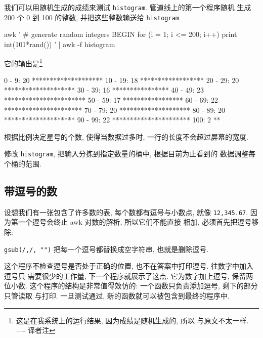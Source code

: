 我们可以用随机生成的成绩来测试 \verb'histogram'. 管道线上的第一个程序随机
生成 200 个 0 到 100 的整数, 并把这些整数输送给 \verb'histogram'
\begin{awkcode}
    awk '
    # generate random integers
    BEGIN { for (i = 1; i <= 200; i++)
                print int(101*rand())
          }
    ' |
    awk -f histogram
\end{awkcode}
它的输出是\footnote{这是在我系统上的运行结果, 因为成绩是随机生成的, 所以 
与原文不太一样. ---- 译者注}
\begin{shell}
      0 -  9:  20 ********************
     10 - 19:  18 ******************
     20 - 29:  20 ********************
     30 - 39:  16 ****************
     40 - 49:  23 ***********************
     50 - 59:  17 *****************
     60 - 69:  22 **********************
     70 - 79:  20 ********************
     80 - 89:  20 ********************
     90 - 99:  22 **********************
    100:        2 **
\end{shell}

\begin{exercise}
    根据比例决定星号的个数, 使得当数据过多时, 一行的长度不会超过屏幕的宽度.
\end{exercise}

\begin{exercise}
    修改 \verb'histogram', 把输入分拣到指定数量的桶中, 根据目前为止看到的
    数据调整每个桶的范围.
\end{exercise}

\subsection{带逗号的数}
\label{subsec:numbers_with_commas}

设想我们有一张包含了许多数的表, 每个数都有逗号与小数点, 就像
\verb'12,345.67'. 因为第一个逗号会终止 awk 对数的解析, 所以它们不能直接
相加, 必须首先把逗号移除:
\verb'gsub(/,/, "")' 把每一个逗号都替换成空字符串, 也就是删除逗号.

这个程序不检查逗号是否处于正确的位置,
也不在答案中打印逗号. 往数字中加入逗号只
需要很少的工作量, 下一个程序就展示了这点. 它为数字加上逗号, 保留两位小数.
这个程序的结构是非常值得效仿的: 一个函数只负责添加逗号, 剩下的部分只管读取
与打印. 一旦测试通过, 新的函数就可以被包含到最终的程序中.

